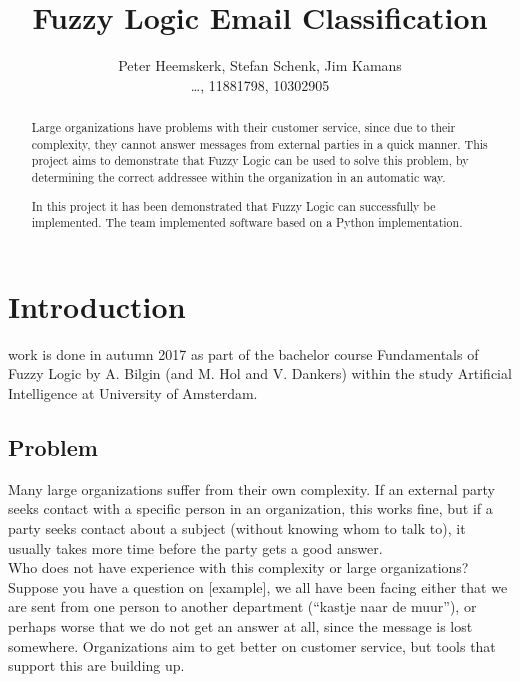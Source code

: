 \documentclass[journal]{IEEEtran}
\begin{document}
\title{Fuzzy Logic Email Classification}
\author{Peter Heemskerk, Stefan Schenk, Jim Kamans\\\dots, 11881798, 10302905}


\maketitle

\begin{abstract}
Large organizations have problems with their customer service, since due to their complexity, they cannot answer messages from external parties in a quick manner. This project aims to demonstrate that Fuzzy Logic can be used to solve this problem, by determining the correct addressee within the organization in an automatic way.

In this project it has been demonstrated that Fuzzy Logic can successfully be implemented. The team implemented software based on a Python implementation.
\end{abstract}


\section{Introduction}
 work is done in autumn 2017 as part of the bachelor course Fundamentals of Fuzzy Logic by A. Bilgin (and  M. Hol and V. Dankers) within the study Artificial Intelligence at University of Amsterdam.

\subsection{Problem}
Many large organizations suffer from their own complexity. If an external party seeks contact with a specific person in an organization, this works fine, but if a party seeks contact about a subject (without knowing whom to talk to), it usually takes more time before the party gets a good answer. \\

Who does not have experience with this complexity or large organizations? Suppose you have a question on [example], we all have been facing either that we are sent from one person to another department (``kastje naar de muur''), or perhaps worse that we do not get an answer at all, since the message is lost somewhere. Organizations aim to get better on customer service, but tools that support this are building up. \\
\end{document}
